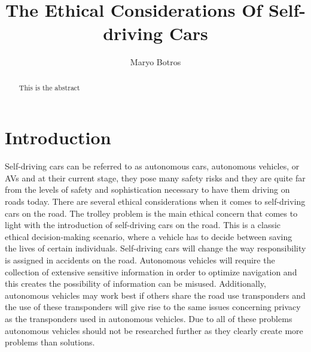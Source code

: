 \documentclass[10pt,twocolumn]{article}
\title{The Ethical Considerations Of Self-driving Cars}
\author{Maryo Botros}
\affiliation{Occidental College}
\begin{document}
\maketitle

\begin{abstract}
    This is the abstract
    
\end{abstract}

\section{Introduction}

Self-driving cars can be referred to as autonomous cars, autonomous vehicles, or AVs and at their current stage, they pose many safety risks and they are quite far from the levels of safety and sophistication necessary to have them driving on roads today. There are several ethical considerations when it comes to self-driving cars on the road. The trolley problem is the main ethical concern that comes to light with the introduction of self-driving cars on the road. This is a classic ethical decision-making scenario, where a vehicle has to decide between saving the lives of certain individuals. Self-driving cars will change the way responsibility is assigned in accidents on the road. Autonomous vehicles will require the collection of extensive sensitive information in order to optimize navigation and this creates the possibility of information can be misused. Additionally, autonomous vehicles may work best if others share the road use transponders and the use of these transponders will give rise to the same issues concerning privacy as the transponders used in autonomous vehicles. Due to all of these problems autonomous vehicles should not be researched further as they clearly create more problems than solutions. 
\end{document}
